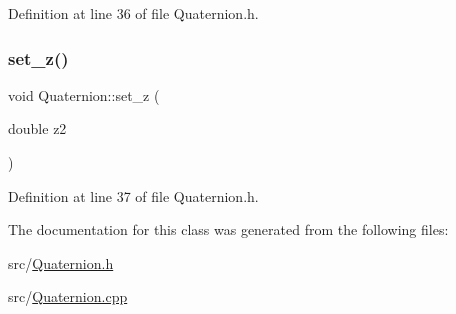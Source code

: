 Definition at line 36 of file Quaternion.\+h.

\mbox{\label{class_quaternion_a5a799468a4c8d0ea6f4ddcdbb25ce65b}} 
\subsubsection{\texorpdfstring{set\+\_\+z()}{set\_z()}}
{\footnotesize\ttfamily void Quaternion\+::set\+\_\+z (\begin{DoxyParamCaption}\item[{double}]{z2 }\end{DoxyParamCaption})\hspace{0.3cm}{\ttfamily [inline]}}



Definition at line 37 of file Quaternion.\+h.



The documentation for this class was generated from the following files\+:\begin{DoxyCompactItemize}
\item 
src/\mbox{\hyperlink{_quaternion_8h}{Quaternion.\+h}}\item 
src/\mbox{\hyperlink{_quaternion_8cpp}{Quaternion.\+cpp}}\end{DoxyCompactItemize}
